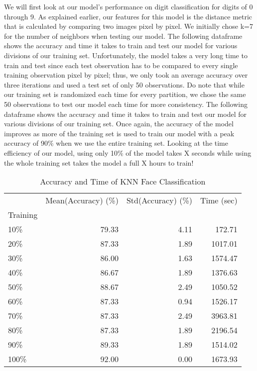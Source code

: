 \documentclass[10pt,parskip=half,
toc=sectionentrywithdots,
bibliography=totocnumbered,
captions=tableheading,numbers=noendperiod]{scrartcl}
\begin{document}
We will first look at our model's performance on digit classification
for digits of 0 through 9. As explained earlier, our features for this
model is the distance metric that is calculated by comparing two images
pixel by pixel. We initially chose k=7 for the number of neighbors when
testing our model. The following dataframe shows the accuracy and time
it takes to train and test our model for various divisions of our
training set. Unfortunately, the model takes a very long time to train
and test since each test observation has to be compared to every single
training observation pixel by pixel; thus, we only took an average
accuracy over three iterations and used a test set of only 50
observations. Do note that while our training set is randomized each
time for every partition, we chose the same 50 observations to test our
model each time for more consistency. The following dataframe shows the
accuracy and time it takes to train and test our model for various
divisions of our training set. Once again, the accuracy of the model
improves as more of the training set is used to train our model with a
peak accuracy of 90\% when we use the entire training set. Looking at
the time efficiency of our model, using only 10\% of the model takes X
seconds while using the whole training set takes the model a full X
hours to train!

\begin{table}[H]
\caption{Accuracy and Time of KNN Face Classification}\label{tbl:tlabel}
\centering
\begin{adjustbox}{max width=\textwidth}
\begin{tabular}{lrrr}
\toprule
{} &  Mean(Accuracy) (\%) &  Std(Accuracy) (\%) &  Time (sec) \\
Training &                     &                    &             \\
\midrule
10\%      &               79.33 &               4.11 &      172.71 \\
20\%      &               87.33 &               1.89 &     1017.01 \\
30\%      &               86.00 &               1.63 &     1574.47 \\
40\%      &               86.67 &               1.89 &     1376.63 \\
50\%      &               88.67 &               2.49 &     1050.52 \\
60\%      &               87.33 &               0.94 &     1526.17 \\
70\%      &               87.33 &               2.49 &     3963.81 \\
80\%      &               87.33 &               1.89 &     2196.54 \\
90\%      &               89.33 &               1.89 &     1514.02 \\
100\%     &               92.00 &               0.00 &     1673.93 \\
\bottomrule
\end{tabular}

\end{adjustbox}
\end{table}
\end{document}
